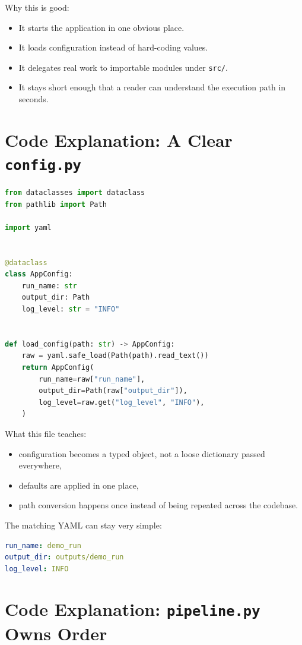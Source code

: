 \documentclass[11pt,oneside]{book}
\begin{document}
Why this is good:
\begin{itemize}
  \item It starts the application in one obvious place.
  \item It loads configuration instead of hard-coding values.
  \item It delegates real work to importable modules under \texttt{src/}.
  \item It stays short enough that a reader can understand the execution path in seconds.
\end{itemize}

\section*{Code Explanation: A Clear \texttt{config.py}}

\begin{lstlisting}[style=bookcode,language=Python]
from dataclasses import dataclass
from pathlib import Path

import yaml


@dataclass
class AppConfig:
    run_name: str
    output_dir: Path
    log_level: str = "INFO"


def load_config(path: str) -> AppConfig:
    raw = yaml.safe_load(Path(path).read_text())
    return AppConfig(
        run_name=raw["run_name"],
        output_dir=Path(raw["output_dir"]),
        log_level=raw.get("log_level", "INFO"),
    )
\end{lstlisting}

What this file teaches:
\begin{itemize}
  \item configuration becomes a typed object, not a loose dictionary passed everywhere,
  \item defaults are applied in one place,
  \item path conversion happens once instead of being repeated across the codebase.
\end{itemize}

The matching YAML can stay very simple:

\begin{lstlisting}[style=bookcode,language=yaml]
run_name: demo_run
output_dir: outputs/demo_run
log_level: INFO
\end{lstlisting}

\section*{Code Explanation: \texttt{pipeline.py} Owns Order}
\end{document}
